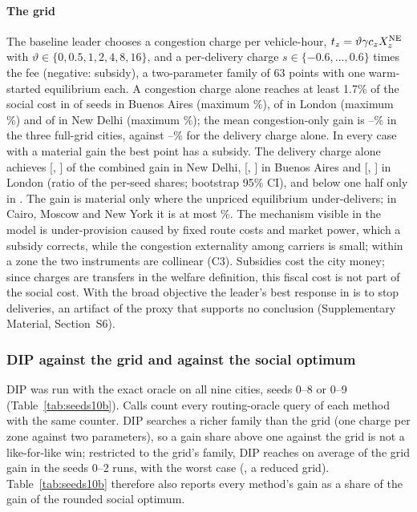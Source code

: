 \documentclass[preprint,11pt]{elsarticle}
\theoremstyle{definition}
\theoremstyle{remark}
\newcommand{\SM}[1]{Supplementary Material, Section~#1}
\begin{document}
\paragraph{The grid} The baseline leader chooses a congestion charge per vehicle-hour, $t_z=\vartheta\gamma c_zX_z^{\rm NE}$ with $\vartheta\in\{0,0.5,1,2,4,8,16\}$, and a per-delivery charge $s\in\{-0.6,\dots,0.6\}$ times the fee (negative: subsidy), a two-parameter family of 63 points with one warm-started equilibrium each. A congestion charge alone reaches at least 1.7\% of the social cost in \TenCongHiBuenosAires{} of \TenNBuenosAires{} seeds in Buenos Aires (maximum \TenCongMaxBuenosAires\%), \TenCongHiLondon{} of \TenNLondon{} in London (maximum \TenCongMaxLondon\%) and \TenCongHiNewDelhi{} of \TenNNewDelhi{} in New Delhi (maximum \TenCongMaxNewDelhi\%); the mean congestion-only gain is \TenCongMeanMin--\TenCongMeanMax\% in the three full-grid cities, against \TenDelMeanMin--\TenDelMeanMax\% for the delivery charge alone. In every case with a material gain the best point has a subsidy. The delivery charge alone achieves \TenShareNewDelhi{} [\TenShareLoNewDelhi, \TenShareHiNewDelhi] of the combined gain in New Delhi, \TenShareBuenosAires{} [\TenShareLoBuenosAires, \TenShareHiBuenosAires] in Buenos Aires and \TenShareLondon{} [\TenShareLoLondon, \TenShareHiLondon] in London (ratio of the per-seed shares; bootstrap 95\% CI), and below one half only in \TenShareBelowHalf. The gain is material only where the unpriced equilibrium under-delivers; in Cairo, Moscow and New York it is at most \EtwoSmallMax\%. The mechanism visible in the model is under-provision caused by fixed route costs and market power, which a subsidy corrects, while the congestion externality among carriers is small; within a zone the two instruments are collinear (C3). Subsidies cost the city money; since charges are transfers in the welfare definition, this fiscal cost is not part of the social cost. With the broad objective the leader's best response in \EtwoBroadShutdownCities{} is to stop deliveries, an artifact of the proxy that supports no conclusion (\SM{S6}).

\subsubsection{DIP against the grid and against the social optimum}\label{sec:res-dip}

DIP was run with the exact oracle on all nine cities, seeds 0--8 or 0--9 (Table~\ref{tab:seeds10b}). Calls count every routing-oracle query of each method with the same counter. DIP searches a richer family than the grid (one charge per zone against two parameters), so a gain share above one against the grid is not a like-for-like win; restricted to the grid's family, DIP reaches on average \DipFamMean{} of the grid gain in the seeds 0--2 runs, with the worst case \DipFamMin{} (\DipFamMinCase, a reduced grid). Table~\ref{tab:seeds10b} therefore also reports every method's gain as a share of the gain of the rounded social optimum.
\end{document}
